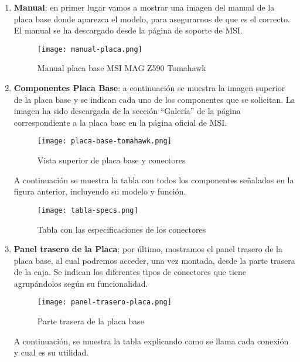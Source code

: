 \begin{enumerate}
    \item \textbf{Manual}: en primer lugar vamos a mostrar una imagen del manual de la placa base donde aparezca el modelo, para asegurarnos de que es el correcto. El manual se ha descargado desde la página de soporte de MSI. \cite{msi01}

    \begin{figure}[ht]
        \centering
        \texttt{[image: manual-placa.png]}
        \caption{Manual placa base MSI MAG Z590 Tomahawk}
    \end{figure}

    \item \textbf{Componentes Placa Base}: a continuación se muestra la imagen superior de la placa base y se indican cada uno de los componentes que se solicitan. La imagen ha sido descargada de la sección ``Galería'' de la página correspondiente a la placa base en la página oficial de MSI. \cite{msi02}

    \begin{figure}[ht]
        \centering
        \texttt{[image: placa-base-tomahawk.png]}
        \caption{Vista superior de placa base y conectores}
    \end{figure}

    A continuación se muestra la tabla con todos los componentes señalados en la figura anterior, incluyendo su modelo y función.

    \begin{figure}[ht]
        \centering
        \texttt{[image: tabla-specs.png]}
        \caption{Tabla con las especificaciones de los conectores}
    \end{figure}

    \item \textbf{Panel trasero de la Placa}: por último, mostramos el panel trasero de la placa base, al cual podremos acceder, una vez montada, desde la parte trasera de la caja. Se indican los diferentes tipos de conectores que tiene agrupándolos según su funcionalidad.

    \vspace{4em}

    \begin{figure}[ht]
        \centering
        \texttt{[image: panel-trasero-placa.png]}
        \caption{Parte trasera de la placa base}
    \end{figure}

    A continuación, se muestra la tabla explicando como se llama cada conexión y cual es su utilidad.


\end{enumerate}
